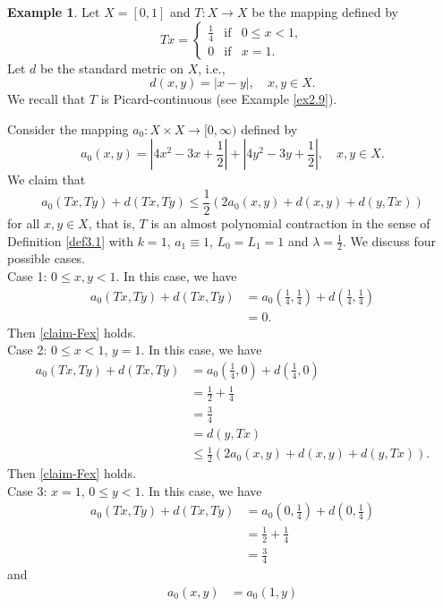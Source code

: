 \documentclass[letterpaper,12pt]{article}
\numberwithin{equation}{section}
\theoremstyle{definition}
\newtheorem{example}[theorem]{Example}
\theoremstyle{remark}
\begin{document}
\begin{example}\label{ex3.7}
Let $X=[0,1]$ and $T: X\to X$ be the mapping defined by
$$
Tx=\left\{\begin{array}{llll}
\frac{1}{4} &\mbox{if}& 0\leq x<1,\\[4pt]
0 &\mbox{if}& x=1.	
\end{array}
\right.
$$	
Let $d$ be the standard metric on $X$, i.e., 
$$
d(x,y)=|x-y|,\quad x,y\in X. 
$$ 	
We recall that $T$ is Picard-continuous (see Example \ref{ex2.9}).  

Consider  the mapping $a_0: X\times X\to [0,\infty)$ defined by 
$$
a_0(x,y)=\left|4x^2-3x+\frac{1}{2}\right|+\left|4y^2-3y+\frac{1}{2}\right|,\quad x,y\in X. 
$$
We claim that 
\begin{equation}\label{claim-Fex}
a_0(Tx,Ty)+d(Tx,Ty)\leq \frac{1}{2} \left(2a_0(x,y)+d(x,y)+d(y,Tx)\right)
\end{equation}
for all $x,y\in X$, that is, $T$ is an almost polynomial contraction in the sense of Definition \ref{def3.1} with $k=1$, $a_1\equiv 1$, $L_0=L_1=1$ and $\lambda=\frac{1}{2}$. We discuss four possible cases.\\
Case 1: $0\leq x,y<1$. In this case, we have 
$$
\begin{aligned}
a_0(Tx,Ty)+d(Tx,Ty)&=a_0\left(\frac{1}{4},\frac{1}{4}\right)+d\left(\frac{1}{4},\frac{1}{4}\right)\\
&=0.
\end{aligned}
$$  
Then \eqref{claim-Fex} holds. \\
Case 2: $0\leq x<1$, $y=1$. In this case, we have
$$
\begin{aligned}
a_0(Tx,Ty)+d(Tx,Ty)&=a_0\left(\frac{1}{4},0\right)+d\left(\frac{1}{4},0\right)\\
&=\frac{1}{2}+\frac{1}{4}\\
&=\frac{3}{4}\\
&=d(y,Tx)\\
&\leq \frac{1}{2} \left(2a_0(x,y)+d(x,y)+d(y,Tx)\right).
\end{aligned}
$$ 
Then \eqref{claim-Fex} holds. \\
Case 3: $x=1$, $0\leq y<1$. In this case, we have
$$
\begin{aligned}
a_0(Tx,Ty)+d(Tx,Ty)&=a_0\left(0,\frac{1}{4}\right)+d\left(0,\frac{1}{4}\right)\\
&=\frac{1}{2}+\frac{1}{4}\\
&=\frac{3}{4}
\end{aligned}
$$ 
and
$$
\begin{aligned}
a_0(x,y)&=a_0(1,y)\\

\end{aligned}$$
\end{example}
\end{document}
